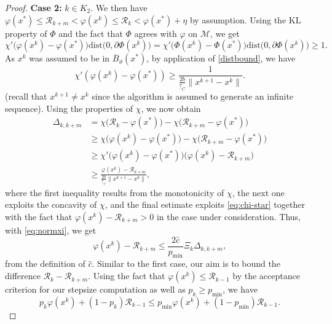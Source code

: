 \documentclass[a4paper, 12pt]{article}
\numberwithin{equation}{section}
\theoremstyle{bolddef}
\theoremstyle{definition}
\theoremstyle{boldplain}
\newcommand{\xk}{x^k}
\newcommand{\xkp}{x^{k+1}}
\newcommand{\pmin}{p_{\min}}
\newcommand{\taug}{\underline{\tau}}
\newcommand{\Rvalue}{\mathcal{R}}
\newcommand{\dist}{\mathrm{dist}}
\newcommand{\clball}{\overline{B}}
\begin{document}
\begin{proof}
\noindent
\textbf{Case 2:} $k \in K_2$. We then have $\varphi(x^*) \leq 
\Rvalue_{k+m} < \varphi(\xk) \leq \Rvalue_{k} < \varphi(x^*) + \eta$
by assumption. Using the KL property of $\Phi$ and the fact that $\Phi$ agrees with $\varphi$ on $\mathcal{M}$, we get
\begin{equation*}
   \chi' \big( \varphi(\xk) - \varphi(x^*) \big) \dist \big( 0, \partial \Phi(\xk) \big) = 
   \chi' \big( \Phi(\xk) - \Phi(x^*) \big) \dist \big( 0, \partial \Phi(\xk) \big) \geq 1.
\end{equation*}
As $\xk$ was assumed to be in $\clball_\vartheta(x^*)$, by application of \eqref{distbound}, we have
\begin{equation}\label{eq:chi-star}
	\chi'(\varphi(\xk) - \varphi(x^*)) \geq \frac{1}{\frac{2 b}{\taug_C} \| \xkp - \xk \|}.
\end{equation}
(recall that $ \xkp \neq \xk $ since the algorithm
is assumed to generate an infinite sequence).
Using the properties of $\chi$, we now obtain
\begin{align*}
   \Delta_{k, k+m} &= \chi \big(\Rvalue_k- \varphi(x^*) \big) -
    \chi \big( \Rvalue_{k+m} - \varphi(x^*) \big) \\
	&\geq \chi \big( \varphi(\xk)- \varphi(x^*) \big) - 
	\chi \big( \Rvalue_{k+m} - \varphi(x^*) \big)\\
	&\geq \chi' \big( \varphi(\xk) - \varphi(x^*) \big) 
	\big( \varphi(\xk) - \Rvalue_{k+m} \big)\\
	&\geq \frac{\varphi(\xk) - \Rvalue_{k+m}}{\frac{2 b}{\taug_C} \| \xkp - \xk \|},
\end{align*}
where the first inequality results from the monotonicity of 
$ \chi $, the next one exploits the concavity of $ \chi $, and 
the final estimate exploits \eqref{eq:chi-star} together with the
fact that $ \varphi(\xk) - \Rvalue_{k+m} > 0 $ in the case under
consideration. Thus, with \eqref{eq:normxi}, we get
\begin{equation*}
   \varphi(\xk) - \Rvalue_{k+m} \leq \frac{2 \hat c}{\pmin} \Xi_k \Delta_{k, k+m},
\end{equation*}
from the definition of $ \hat{c} $.
Similar to the first case, our aim is to bound 
the difference $\Rvalue_k - \Rvalue_{k+m}$. Using the fact that $\varphi(\xk) \leq \Rvalue_{k-1}$ by the acceptance criterion for our 
stepsize computation as well as $p_k \geq \pmin$, we have
\begin{equation*}
	p_k \varphi(\xk) + ( 1- p_k)\Rvalue_{k-1} \leq 
    p_{\min} \varphi(\xk) + ( 1 - p_{\min}) \Rvalue_{k-1} .
\end{equation*}

\end{proof}
\end{document}
